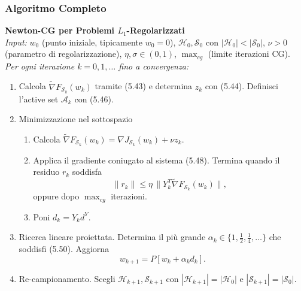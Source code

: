 \documentclass[a4paper,12pt]{article}
\numberwithin{equation}{section}
\numberwithin{figure}{section}
\numberwithin{table}{section}
\begin{document}
\newpage

\subsubsection{Algoritmo Completo}

\begin{actionbox}
  \textbf{Newton-CG per Problemi $L_1$-Regolarizzati}\\[0.3cm]
  \textit{Input:} $w_0$ (punto iniziale, tipicamente $w_0=0$),
  $\mathcal{H}_0, \mathcal{S}_0$ con $|\mathcal{H}_0| < |\mathcal{S}_0|$,
  $\nu > 0$ (parametro di regolarizzazione),
  $\eta, \sigma \in (0,1)$,
  $\operatorname{max}_{cg}$ (limite iterazioni CG).\\[0.1cm]
  
  \textit{Per ogni iterazione $k = 0, 1, \dots$ fino a convergenza:}
  \begin{enumerate}
    \item
    Calcola $\widetilde{\nabla}F_{\mathcal{S}_k}(w_k)$ tramite (5.43) e
    determina $z_k$ con (5.44). Definisci l'active set $\mathcal{A}_k$ con (5.46).
    
    \item Minimizzazione nel sottospazio
    \begin{enumerate}
      \item Calcola $\widetilde{\nabla}F_{\mathcal{S}_k}(w_k) = \nabla J_{\mathcal{S}_k}(w_k) + \nu z_k$.
      \item Applica il gradiente coniugato al sistema (5.48). Termina quando
      il residuo $r_k$ soddisfa
      \[
      \|r_k\| \le \eta \, \|Y_k^T \widetilde{\nabla}F_{\mathcal{S}_k}(w_k)\|, \tag{5.51}\label{eq:cg_l1}
      \]
      oppure dopo $\operatorname{max}_{cg}$ iterazioni.
      \item Poni $d_k = Y_k d^Y$.
    \end{enumerate}
    
    \item Ricerca lineare proiettata.
    Determina il più grande $\alpha_k \in \{1, \frac{1}{2}, \frac{1}{4}, \dots\}$
    che soddisfi (5.50). Aggiorna
    \[
    w_{k+1} = P[w_k + \alpha_k d_k].
    \]
    
    \item Re-campionamento.
    Scegli $\mathcal{H}_{k+1}, \mathcal{S}_{k+1}$ con
    $|\mathcal{H}_{k+1}| = |\mathcal{H}_0|$ e
    $|\mathcal{S}_{k+1}| = |\mathcal{S}_0|$.
  \end{enumerate}
\end{actionbox}
\end{document}
